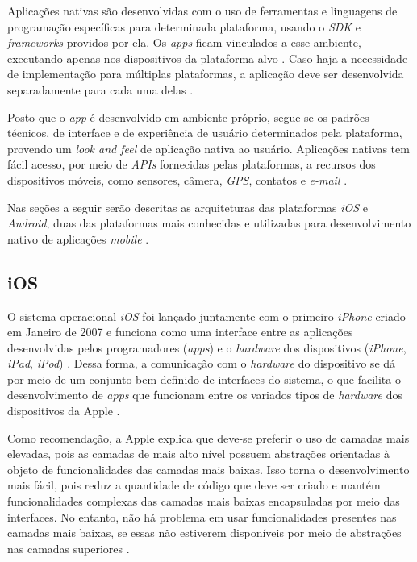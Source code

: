 Aplicações nativas são desenvolvidas com o uso de ferramentas e linguagens de programação específicas para determinada plataforma, usando o \textit{SDK} e \textit{frameworks} providos por ela. Os \textit{apps} ficam vinculados a esse ambiente, executando apenas nos dispositivos da plataforma alvo \cite{kassas_taxonomy_2015}. Caso haja a necessidade de implementação para múltiplas plataformas, a aplicação deve ser desenvolvida separadamente para cada uma delas \cite{heitkotter_evaluating_2013}.

Posto que o \textit{app} é desenvolvido em ambiente próprio, segue-se os padrões técnicos, de interface e de experiência de usuário determinados pela plataforma, provendo um \textit{look and feel} de aplicação nativa ao usuário.
Aplicações nativas tem fácil acesso, por meio de \textit{APIs} fornecidas pelas plataformas, a recursos dos dispositivos móveis, como sensores, câmera, \textit{GPS}, contatos e \textit{e-mail} \cite{kassas_taxonomy_2015}.

Nas seções a seguir serão descritas as arquiteturas das plataformas \textit{iOS} e \textit{Android}, duas das plataformas mais conhecidas e utilizadas para desenvolvimento nativo de aplicações \textit{mobile} \cite{jobe_native_2013}.

\subsection{iOS} \label{subsection:ios}

O sistema operacional \textit{iOS} foi lançado juntamente com o primeiro \textit{iPhone} criado em Janeiro de 2007 e 
funciona como uma interface entre as aplicações desenvolvidas pelos programadores (\textit{apps}) e o \textit{hardware} 
dos dispositivos (\textit{iPhone}, \textit{iPad}, \textit{iPod}) \cite{apple_inc_apple_2007}. 
Dessa forma, a comunicação com o \textit{hardware} do dispositivo se dá 
por meio de um conjunto bem definido de interfaces do sistema, o que facilita o desenvolvimento de \textit{apps} 
que funcionam entre os variados tipos de \textit{hardware} dos dispositivos da Apple \cite{apple_inc_developing_2016}. 

Como recomendação, a Apple explica que deve-se preferir o uso de camadas mais elevadas, pois as camadas de 
mais alto nível possuem abstrações orientadas à objeto de funcionalidades das camadas mais baixas. Isso 
torna o desenvolvimento mais fácil, pois reduz a quantidade de código que deve ser criado e mantém funcionalidades 
complexas das camadas mais baixas encapsuladas por meio das interfaces. No entanto, não há problema em usar 
funcionalidades presentes nas camadas mais baixas, se essas não estiverem disponíveis por meio de abstrações nas 
camadas superiores \cite{apple_inc_tech_2014}. 

